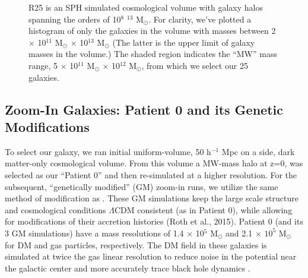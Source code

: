 \documentclass[]{emulateapj}
\begin{document}
\begin{figure}[]
\centerline{}
\caption[]{R25 is an SPH simulated cosmological volume with galaxy halos spanning the orders of 10$^{8}$ $^{13}$ M$_{\odot}$. For clarity, we've plotted a histogram of only the galaxies in the volume with masses between 2 $\times$ 10$^{11}$ M$_{\odot}$  $\times$ 10$^{13}$ M$_{\odot}$ (The latter is the upper limit of galaxy masses in the volume.) The shaded region indicates the ``MW'' mass range, 5 $\times$ 10$^{11}$ M$_{\odot}$  $\times$ 10$^{12}$ M$_{\odot}$, from which we select our 25 galaxies.}
\label{ROMhist}
\end{figure}

\subsection{Zoom-In Galaxies: Patient 0 and its Genetic Modifications}
To select our galaxy, we ran initial uniform-volume, 50 h$^{-1}$ Mpc on a side, dark matter-only cosmological volume. From this volume a MW-mass halo at z=0, was selected as our ``Patient 0'' and then re-simulated at a higher resolution. For the subsequent, ``genetically modified'' (GM) zoom-in runs, we utilize the same method of modification as \cite{Pontzen2016}. These GM simulations keep the large scale structure and cosmological conditions $\Lambda$CDM consistent (as in Patient 0), while allowing for modifications of their accretion histories (Roth et al., 2015). Patient 0 (and its 3 GM simulations) have a mass resolutions of 1.4 $\times$ 10$^5$ M$_{\odot}$ and 2.1 $\times$ $10^5$ M$_{\odot}$ for DM and gas particles, respectively. The DM field in these galaxies is simulated at twice the gas linear resolution to reduce noise in the potential near the galactic center \citep{Pontzen2016} and more accurately trace black hole dynamics \citep{Tremmel2015}.
\end{document}
